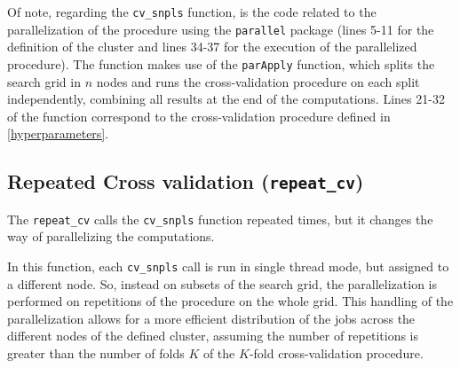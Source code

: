 Of note, regarding the \texttt{cv\_snpls} function, is the code related to the parallelization of the procedure using the \texttt{parallel} package (lines 5-11 for the definition of the cluster and lines 34-37 for the execution of the parallelized procedure). The function makes use of the \texttt{parApply} function, which splits the search grid in $n$ nodes and runs the cross-validation procedure on each split independently, combining all results at the end of the computations. Lines 21-32 of the function correspond to the cross-validation procedure defined in \autoref{hyperparameters}.

\subsection{Repeated Cross validation (\texttt{repeat\_cv})}
\label{repeatcv}
The \texttt{repeat\_cv} calls the \texttt{cv\_snpls} function repeated times, but it changes the way of parallelizing the computations. 

In this function, each \texttt{cv\_snpls} call is run in single thread mode, but assigned to a different node. So, instead on subsets of the search grid, the parallelization is performed on repetitions of the procedure on the whole grid. This handling of the parallelization allows for a more efficient distribution of the jobs across the different nodes of the defined cluster, assuming the number of repetitions is greater than the number of folds $K$ of the $K$-fold cross-validation procedure.

